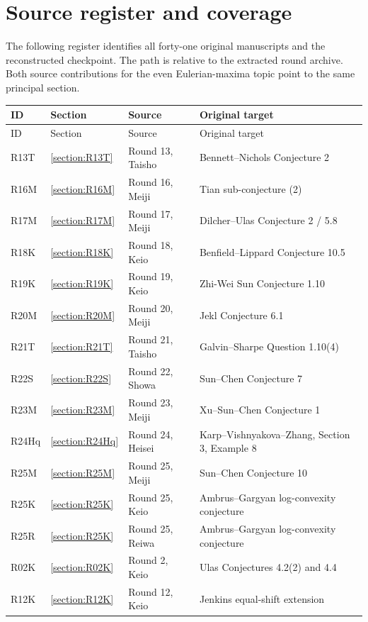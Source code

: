 \documentclass[11pt,a4paper]{article}
\begin{document}
\section{Source register and coverage}
The following register identifies all forty-one original manuscripts and the reconstructed checkpoint. The path is relative to the extracted round archive. Both source contributions for the even Eulerian-maxima topic point to the same principal section.
\begingroup\footnotesize
\begin{longtable}{@{}L{.12\textwidth}L{.08\textwidth}L{.19\textwidth}L{.53\textwidth}@{}}
\toprule ID & Section & Source & Original target\\\midrule\endfirsthead
\toprule ID & Section & Source & Original target\\\midrule\endhead
R13T & \ref{section:R13T} & Round 13, Taisho & Bennett--Nichols Conjecture 2\\
R16M & \ref{section:R16M} & Round 16, Meiji & Tian sub-conjecture (2)\\
R17M & \ref{section:R17M} & Round 17, Meiji & Dilcher--Ulas Conjecture 2 / 5.8\\
R18K & \ref{section:R18K} & Round 18, Keio & Benfield--Lippard Conjecture 10.5\\
R19K & \ref{section:R19K} & Round 19, Keio & Zhi-Wei Sun Conjecture 1.10\\
R20M & \ref{section:R20M} & Round 20, Meiji & Jekl Conjecture 6.1\\
R21T & \ref{section:R21T} & Round 21, Taisho & Galvin--Sharpe Question 1.10(4)\\
R22S & \ref{section:R22S} & Round 22, Showa & Sun--Chen Conjecture 7\\
R23M & \ref{section:R23M} & Round 23, Meiji & Xu--Sun--Chen Conjecture 1\\
R24Hq & \ref{section:R24Hq} & Round 24, Heisei & Karp--Vishnyakova--Zhang, Section 3, Example 8\\
R25M & \ref{section:R25M} & Round 25, Meiji & Sun--Chen Conjecture 10\\
R25K & \ref{section:R25K} & Round 25, Keio & Ambrus--Gargyan log-convexity conjecture\\
R25R & \ref{section:R25K} & Round 25, Reiwa & Ambrus--Gargyan log-convexity conjecture\\
R02K & \ref{section:R02K} & Round 2, Keio & Ulas Conjectures 4.2(2) and 4.4\\
R12K & \ref{section:R12K} & Round 12, Keio & Jenkins equal-shift extension\\

\end{longtable}
\end{document}
